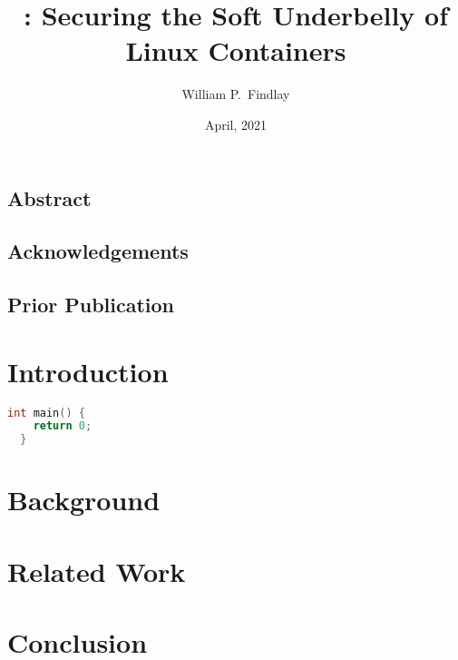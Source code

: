 \documentclass[
  fontsize=12pt,
  paper=letter,
  twosided,
  cleardoublepage=plain,
]{scrbook}
\title{\bpfcontain\@: Securing the Soft Underbelly of Linux Containers}
\author{William P.~Findlay}
\date{April, 2021}
\begin{document}



\frontmatter%

\section*{Abstract}
\cleardoublepage%

\section*{Acknowledgements}
\cleardoublepage%

\section*{Prior Publication}
\cleardoublepage%

\begingroup
\hypersetup{linkcolor=black}
\tableofcontents
\listoffigures
\listoftables
\endgroup

\mainmatter%


\chapter{Introduction}%
\label{c:introduction}


\begin{lstlisting}[language=c,caption={Hello there}]
  int main() {
    return 0;
  }
\end{lstlisting}

\chapter{Background}%
\label{c:background}


\chapter{Related Work}%
\label{c:related}


\chapter{Conclusion}%
\label{c:conclusion}

\end{document}

